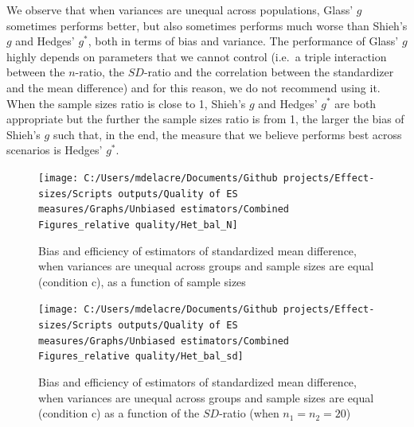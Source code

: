\documentclass[
  english,
  man,floatsintext]{apa6}
\begin{document}
We observe that when variances are unequal across populations, Glass' \(g\) sometimes performs better, but also sometimes performs much worse than Shieh's \(g\) and Hedges' \(g^*\), both in terms of bias and variance. The performance of Glass' \(g\) highly depends on parameters that we cannot control (i.e.~a triple interaction between the \(n\)-ratio, the \(SD\)-ratio and the correlation between the standardizer and the mean difference) and for this reason, we do not recommend using it. When the sample sizes ratio is close to 1, Shieh's \(g\) and Hedges' \(g^*\) are both appropriate but the further the sample sizes ratio is from 1, the larger the bias of Shieh's \(g\) such that, in the end, the measure that we believe performs best across scenarios is Hedges' \(g^*\).

\begin{landscape}
\newpage

\begin{figure}

{\centering \texttt{[image: C:/Users/mdelacre/Documents/Github projects/Effect-sizes/Scripts outputs/Quality of ES measures/Graphs/Unbiased estimators/Combined Figures\_relative quality/Het\_bal\_N]} 

}

\caption{Bias and efficiency of estimators of standardized mean difference, when variances are unequal across groups and sample sizes are equal (condition c), as a function of sample sizes}\label{fig:idHetbal1}
\end{figure}

\end{landscape}
\newpage
\begin{landscape}

\begin{figure}

{\centering \texttt{[image: C:/Users/mdelacre/Documents/Github projects/Effect-sizes/Scripts outputs/Quality of ES measures/Graphs/Unbiased estimators/Combined Figures\_relative quality/Het\_bal\_sd]} 

}

\caption{Bias and efficiency of estimators of standardized mean difference, when variances are unequal across groups and sample sizes are equal (condition c) as a function of the $SD$-ratio (when $n_1=n_2=20$)}\label{fig:idHetbal2}
\end{figure}

\end{landscape}
\newpage
\end{document}
